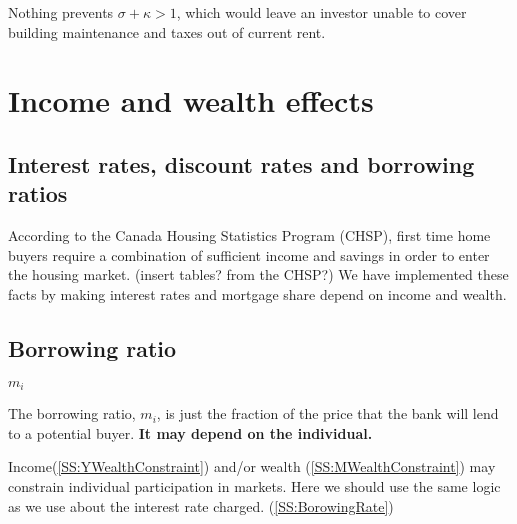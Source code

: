 Nothing prevents $\sigma+\kappa >1$, which would leave an investor unable to cover building maintenance and taxes out of current rent. 


\section{Income and wealth effects}
\subsection{Interest rates, discount rates and borrowing ratios} \label{SS:RatesAndRatios}

According to the Canada Housing Statistics Program (CHSP), first time home buyers require a combination of sufficient income and savings in order to enter the housing market. (insert tables? from the CHSP?) We have implemented these facts by making interest rates and mortgage share depend on income and wealth.




 

\subsection{Borrowing ratio} \label{SS:BorrowingRatio}
$m_i$

The borrowing ratio, $m_i$, is just the fraction of the price that the bank will lend to a potential buyer. \textbf{It may depend on the individual.} 

Income(\ref{SS:YWealthConstraint}) and/or wealth (\ref {SS:MWealthConstraint}) may constrain individual participation in markets. 
Here we should use the same logic as we use about the interest rate charged. (\ref{SS:BorowingRate})

